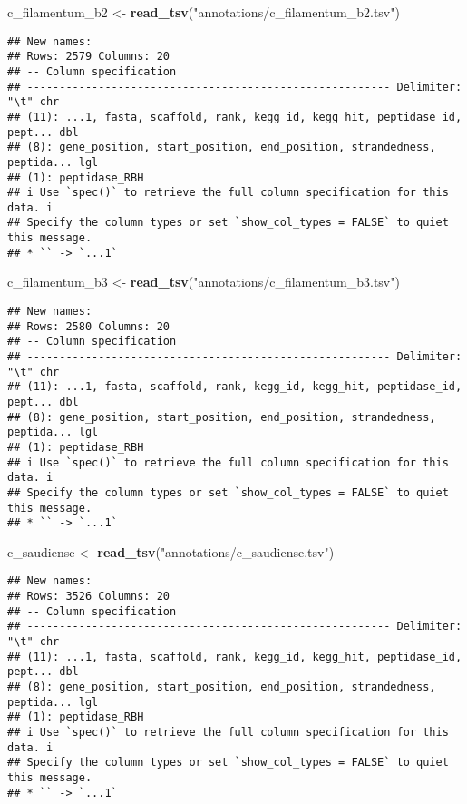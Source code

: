 \documentclass[
]{article}
\newenvironment{Shaded}{\begin{snugshade}}{\end{snugshade}}
\newcommand{\FunctionTok}[1]{\textcolor[rgb]{0.13,0.29,0.53}{\textbf{#1}}}
\newcommand{\NormalTok}[1]{#1}
\newcommand{\OtherTok}[1]{\textcolor[rgb]{0.56,0.35,0.01}{#1}}
\newcommand{\StringTok}[1]{\textcolor[rgb]{0.31,0.60,0.02}{#1}}
\begin{document}
\begin{Shaded}
\begin{Highlighting}[]
\NormalTok{c\_filamentum\_b2 }\OtherTok{\textless{}{-}} \FunctionTok{read\_tsv}\NormalTok{(}\StringTok{"annotations/c\_filamentum\_b2.tsv"}\NormalTok{)}
\end{Highlighting}
\end{Shaded}

\begin{verbatim}
## New names:
## Rows: 2579 Columns: 20
## -- Column specification
## -------------------------------------------------------- Delimiter: "\t" chr
## (11): ...1, fasta, scaffold, rank, kegg_id, kegg_hit, peptidase_id, pept... dbl
## (8): gene_position, start_position, end_position, strandedness, peptida... lgl
## (1): peptidase_RBH
## i Use `spec()` to retrieve the full column specification for this data. i
## Specify the column types or set `show_col_types = FALSE` to quiet this message.
## * `` -> `...1`
\end{verbatim}

\begin{Shaded}
\begin{Highlighting}[]
\NormalTok{c\_filamentum\_b3 }\OtherTok{\textless{}{-}} \FunctionTok{read\_tsv}\NormalTok{(}\StringTok{"annotations/c\_filamentum\_b3.tsv"}\NormalTok{)}
\end{Highlighting}
\end{Shaded}

\begin{verbatim}
## New names:
## Rows: 2580 Columns: 20
## -- Column specification
## -------------------------------------------------------- Delimiter: "\t" chr
## (11): ...1, fasta, scaffold, rank, kegg_id, kegg_hit, peptidase_id, pept... dbl
## (8): gene_position, start_position, end_position, strandedness, peptida... lgl
## (1): peptidase_RBH
## i Use `spec()` to retrieve the full column specification for this data. i
## Specify the column types or set `show_col_types = FALSE` to quiet this message.
## * `` -> `...1`
\end{verbatim}

\begin{Shaded}
\begin{Highlighting}[]
\NormalTok{c\_saudiense }\OtherTok{\textless{}{-}} \FunctionTok{read\_tsv}\NormalTok{(}\StringTok{"annotations/c\_saudiense.tsv"}\NormalTok{)}
\end{Highlighting}
\end{Shaded}

\begin{verbatim}
## New names:
## Rows: 3526 Columns: 20
## -- Column specification
## -------------------------------------------------------- Delimiter: "\t" chr
## (11): ...1, fasta, scaffold, rank, kegg_id, kegg_hit, peptidase_id, pept... dbl
## (8): gene_position, start_position, end_position, strandedness, peptida... lgl
## (1): peptidase_RBH
## i Use `spec()` to retrieve the full column specification for this data. i
## Specify the column types or set `show_col_types = FALSE` to quiet this message.
## * `` -> `...1`
\end{verbatim}
\end{document}
